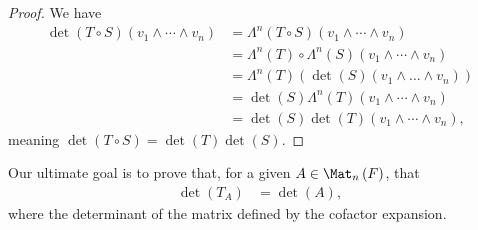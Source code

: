 \documentclass[10pt]{mypackage}
\begin{document}
    \begin{proof}
      We have
      \begin{align*}
        \det(T\circ S)\left(v_1\wedge\cdots\wedge v_n\right) &= \Lambda^{n}\left(T\circ S\right)\left(v_1\wedge\cdots\wedge v_n\right)\\
                                                             &= \Lambda^{n}\left(T\right)\circ \Lambda^{n}\left(S\right)\left(v_1\wedge\cdots\wedge v_n\right)\\
                                                             &= \Lambda^{n}\left(T\right)\left(\det(S)\left(v_1\wedge\dots\wedge v_n\right)\right)\\
                                                             &= \det(S) \Lambda^{n}\left(T\right)\left(v_1\wedge\cdots\wedge v_n\right)\\
                                                             &= \det(S)\det(T) \left(v_1\wedge\cdots\wedge v_n\right),
      \end{align*}
      meaning $\det\left(T\circ S\right) = \det(T)\det(S)$.
    \end{proof}
    Our ultimate goal is to prove that, for a given $A\in \Mat_{n}\left(F\right)$, that
    \begin{align*}
      \det\left(T_{A}\right) &= \det\left(A\right),
    \end{align*}
    where the determinant of the matrix defined by the cofactor expansion.\newline
\end{document}
